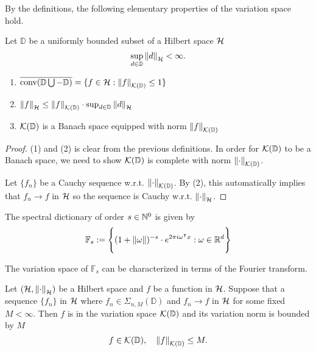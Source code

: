 By the definitions, the following elementary properties of the variation space
hold.
\begin{proposition}
    \label{prop:spaceVar_properties}
    Let $\mathbb{D}$ be a uniformly bounded subset of a Hilbert space $\mathcal{H}$
    \begin{equation}
        \sup_{d\in\mathbb{D}} \left\| d \right\|_{\mathcal{H}} < \infty.
    \end{equation}
    \begin{enumerate}
        \item $\overline{\textnormal{conv}(\mathbb{D} \bigcup - \mathbb{D})} = \{
            f\in\mathcal{H}: \left\| {f} \right\|_{\mathcal{K}({\mathbb{D}})} \leq 1
        \}$
        \item $\left\| f \right\|_{\mathcal{H}} \leq \left\| {f} \right\|_{\mathcal{K}({\mathbb{D}})} \cdot
        \sup_{d\in\mathbb{D}} \left\| d \right\|_{\mathcal{H}}$
        \item $\mathcal{K}({\mathbb{D}})$ is a Banach space equipped with norm
        $\left\| {f} \right\|_{\mathcal{K}({\mathbb{D}})}$
    \end{enumerate}
\end{proposition}

\begin{proof}
    (1) and (2) is clear from the previous definitions. In order for
    $\mathcal{K}({\mathbb{D}})$ to be a Banach space, we need to show
    $\mathcal{K}({\mathbb{D}})$ is complete with norm $\left\| {\cdot} \right\|_{\mathcal{K}({\mathbb{D}})}$.

    Let $\{f_n\}$ be a Cauchy sequence w.r.t. $\left\| {\cdot} \right\|_{\mathcal{K}({\mathbb{D}})}$. By
    (2), this automatically implies that $f_n \to f$ in $\mathcal{H}$ so the
    sequence is Cauchy w.r.t. $\left\| \cdot \right\|_{\mathcal{H}}$.
\end{proof}

\begin{definition}
    The spectral dictionary of order $s \in \mathbb{N}^0$ is given by
    \begin{equation}
        \mathbb{F}_s := \Bigg\{ 
            (1 + \left\| \omega \right\|)^{-s} \cdot e^{2\pi i\omega{}^{\intercal} x}: 
            \omega \in \mathbb{R}^d
        \Bigg\}
    \end{equation}
\end{definition}

The variation space of $\mathbb{F}_s$ can be characterized in terms of the
Fourier transform.

\begin{proposition}

    Let $(\mathcal{H}, \left\| \cdot \right\|_{\mathcal{H}})$ be a Hilbert space and $f$ be a
    function in $\mathcal{H}$. Suppose that a sequence $\{f_n\}$ in $\mathcal{H}$
    where $f_n \in \Sigma_{n,M}(\mathbb{D})$ \TODO and $f_n \to f$ in $\mathcal{H}$
    for some fixed $M < \infty$. Then $f$ is in the variation space
    $\mathcal{K}({\mathbb{D}})$ and its variation norm is bounded by $M$
    \begin{equation}
        f \in \mathcal{K}({\mathbb{D}}), \quad \left\| {f} \right\|_{\mathcal{K}({\mathbb{D}})}\leq M.
    \end{equation}
\end{proposition}

